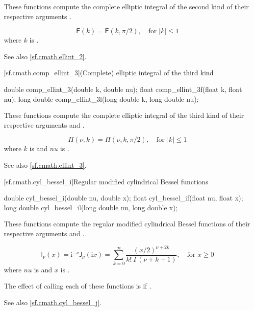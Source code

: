 \begin{itemdescr}

\pnum\effects
These functions compute
the complete elliptic integral of the second kind
of their respective arguments
.

\pnum\returns
\[%
  \mathsf{E}(k) =
  \mathsf{E}(k, \pi / 2),
\quad \mbox{for $|k| \le 1$}
\]
where
$k$ is .

\pnum See also \ref{sf.cmath.ellint_2}.
\end{itemdescr}

[sf.cmath.comp_ellint_3]{(Complete) elliptic integral of the third kind}%
%
%
%
%
%
\begin{itemdecl}
double       comp_ellint_3(double k, double nu);
float        comp_ellint_3f(float k, float nu);
long double  comp_ellint_3l(long double k, long double nu);
\end{itemdecl}

\begin{itemdescr}

\pnum\effects
These functions compute
the complete elliptic integral of the third kind
of their respective arguments
 and .

\pnum\returns
\[%
  \mathsf{\Pi}(\nu, k) = \mathsf{\Pi}(\nu, k, \pi / 2),
		\quad \mbox{for $|k| \le 1$}
\]
where
$k$ is  and
$nu$ is .

\pnum See also \ref{sf.cmath.ellint_3}.
\end{itemdescr}

[sf.cmath.cyl_bessel_i]{Regular modified cylindrical Bessel functions}%
%
%
%
%
%
\begin{itemdecl}
double       cyl_bessel_i(double nu, double x);
float        cyl_bessel_if(float nu, float x);
long double  cyl_bessel_il(long double nu, long double x);
\end{itemdecl}

\begin{itemdescr}

\pnum\effects
These functions compute
the regular modified cylindrical Bessel functions
of their respective arguments
 and .

\pnum\returns
\[%
  \mathsf{I}_\nu(x) =
  \mathrm{i}^{-\nu} \mathsf{J}_\nu(\mathrm{i}x)
  =
  \sum_{k=0}^\infty \frac{(x/2)^{\nu+2k}}
			 {k! \: \Gamma(\nu+k+1)},
	   \quad \mbox{for $x \ge 0$}
\]
where
$nu$ is  and
$x$ is .

\pnum\remarks
The effect of calling each of these functions
is 
if .

\pnum See also \ref{sf.cmath.cyl_bessel_j}.
\end{itemdescr}

